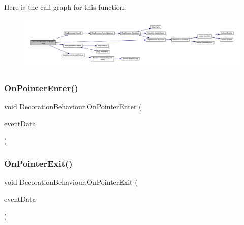 Here is the call graph for this function\+:
\nopagebreak
\begin{figure}[H]
\begin{center}
\leavevmode
\includegraphics[width=350pt]{class_decoration_behaviour_a94a1b5e492f096e3f121d05105e16c37_cgraph}
\end{center}
\end{figure}
\mbox{\label{class_decoration_behaviour_abc5e3d4f07a6da052203565037d8b535}} 
\subsubsection{\texorpdfstring{OnPointerEnter()}{OnPointerEnter()}}
{\footnotesize\ttfamily void Decoration\+Behaviour.\+On\+Pointer\+Enter (\begin{DoxyParamCaption}\item[{Pointer\+Event\+Data}]{event\+Data }\end{DoxyParamCaption})}

\mbox{\label{class_decoration_behaviour_a7c33b0d7ccac7ff55a4acb49b6fa3c83}} 
\subsubsection{\texorpdfstring{OnPointerExit()}{OnPointerExit()}}
{\footnotesize\ttfamily void Decoration\+Behaviour.\+On\+Pointer\+Exit (\begin{DoxyParamCaption}\item[{Pointer\+Event\+Data}]{event\+Data }\end{DoxyParamCaption})}

\mbox{\label{class_decoration_behaviour_a6f5bef52b05859295759318878ec9a1c}} 
